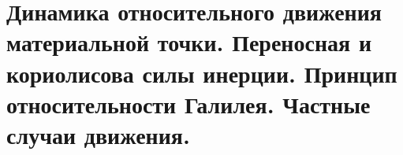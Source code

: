 \chapter{Динамика относительного движения материальной точки. Переносная и
кориолисова силы инерции. Принцип относительности Галилея. Частные случаи
движения.}

\newpage
